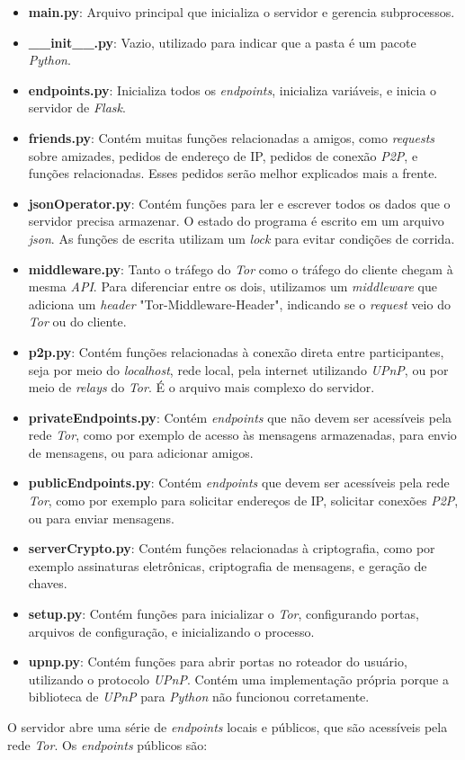 \begin{itemize}
    \item \textbf{main.py}: Arquivo principal que inicializa o servidor e gerencia subprocessos.
    \item \textbf{\_\_init\_\_.py}: Vazio, utilizado para indicar que a pasta é um pacote \textit{Python}.
    \item \textbf{endpoints.py}: Inicializa todos os \textit{endpoints}, inicializa variáveis, e inicia o servidor de \textit{Flask}.
    \item \textbf{friends.py}: Contém muitas funções relacionadas a amigos, como \textit{requests} sobre amizades, pedidos de endereço de IP, pedidos de conexão \textit{P2P}, e funções relacionadas. Esses pedidos serão melhor explicados mais a frente.
    \item \textbf{jsonOperator.py}: Contém funções para ler e escrever todos os dados que o servidor precisa armazenar. O estado do programa é escrito em um arquivo \textit{json}. As funções de escrita utilizam um \textit{lock} para evitar condições de corrida.
    \item \textbf{middleware.py}: Tanto o tráfego do \textit{Tor} como o tráfego do cliente chegam à mesma \textit{API}. Para diferenciar entre os dois, utilizamos um \textit{middleware} que adiciona um \textit{header} "Tor-Middleware-Header", indicando se o \textit{request} veio do \textit{Tor} ou do cliente.
    \item \textbf{p2p.py}: Contém funções relacionadas à conexão direta entre participantes, seja por meio do \textit{localhost}, rede local, pela internet utilizando \textit{UPnP}, ou por meio de \textit{relays} do \textit{Tor}. É o arquivo mais complexo do servidor.
    \item \textbf{privateEndpoints.py}: Contém \textit{endpoints} que não devem ser acessíveis pela rede \textit{Tor}, como por exemplo de acesso às mensagens armazenadas, para envio de mensagens, ou para adicionar amigos.
    \item \textbf{publicEndpoints.py}: Contém \textit{endpoints} que devem ser acessíveis pela rede \textit{Tor}, como por exemplo para solicitar endereços de IP, solicitar conexões \textit{P2P}, ou para enviar mensagens.
    \item \textbf{serverCrypto.py}: Contém funções relacionadas à criptografia, como por exemplo assinaturas eletrônicas, criptografia de mensagens, e geração de chaves.
    \item \textbf{setup.py}: Contém funções para inicializar o \textit{Tor}, configurando portas, arquivos de configuração, e inicializando o processo.
    \item \textbf{upnp.py}: Contém funções para abrir portas no roteador do usuário, utilizando o protocolo \textit{UPnP}. Contém uma implementação própria porque a biblioteca de \textit{UPnP} para \textit{Python} não funcionou corretamente.
\end{itemize}
O servidor abre uma série de \textit{endpoints} locais e públicos, que são acessíveis pela rede \textit{Tor}. Os \textit{endpoints} públicos são:


